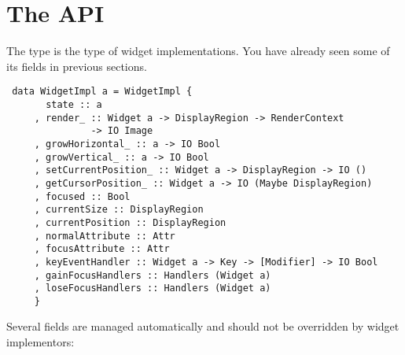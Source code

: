 \section{The  API}

The  type is the type of widget implementations.  You
have already seen some of its fields in previous sections.

\begin{verbatim}
 data WidgetImpl a = WidgetImpl {
       state :: a
     , render_ :: Widget a -> DisplayRegion -> RenderContext
               -> IO Image
     , growHorizontal_ :: a -> IO Bool
     , growVertical_ :: a -> IO Bool
     , setCurrentPosition_ :: Widget a -> DisplayRegion -> IO ()
     , getCursorPosition_ :: Widget a -> IO (Maybe DisplayRegion)
     , focused :: Bool
     , currentSize :: DisplayRegion
     , currentPosition :: DisplayRegion
     , normalAttribute :: Attr
     , focusAttribute :: Attr
     , keyEventHandler :: Widget a -> Key -> [Modifier] -> IO Bool
     , gainFocusHandlers :: Handlers (Widget a)
     , loseFocusHandlers :: Handlers (Widget a)
     }
\end{verbatim}

Several fields are managed automatically and should not be overridden
by widget implementors:

